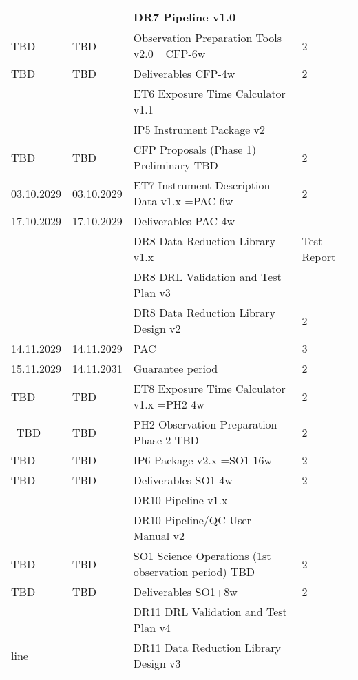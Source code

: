 \begin{table}
\begin{tabularx}{\textwidth}{llll}
   &		    & DR7 Pipeline v1.0					    &	\\
\hline
TBD    & TBD   & Observation Preparation Tools v2.0  =CFP-6w     	    &	2 \\
\hline
TBD	   & TBD   & Deliverables CFP-4w                                         &	2 \\
   &           & ET6 Exposure Time Calculator v1.1			    &	\\
&		   &	IP5 Instrument Package v2				    &	\\
\hline
TBD	   &	TBD	   &	CFP Proposals (Phase 1) Preliminary  TBD		    &	2 \\
\hline
03.10.2029 &	03.10.2029 &	ET7 Instrument Description Data v1.x =PAC-6w		    &	2 \\
\hline
17.10.2029 &	17.10.2029 &	Deliverables PAC-4w                                         &	\\
   	   &               &    DR8 Data Reduction Library v1.x & Test Report               &	\\
           &               &    DR8 DRL Validation and Test Plan v3                         &	\\
           &               &    DR8 Data Reduction Library Design v2			    &	2 \\
\hline
14.11.2029 &	14.11.2029 &	PAC							    &	3 \\
\hline
15.11.2029 &	14.11.2031 &	Guarantee period 					    &	2 \\
\hline
TBD        &	TBD        &	ET8 Exposure Time Calculator v1.x =PH2-4w		    &	2 \\
\
TBD        &	TBD        &	PH2 Observation Preparation Phase 2 TBD			    &	2 \\
\hline
TBD        &	TBD        &	IP6 Package v2.x =SO1-16w				    &	2 \\
\hline
TBD        &	TBD        &	Deliverables SO1-4w                                         &	2 \\
           &               &    DR10 Pipeline v1.x					    &	\\
           &		   &	DR10 Pipeline/QC User Manual v2				    &	\\
\hline
TBD        &	TBD        &	SO1 Science Operations (1st observation period) TBD	    &	2 \\
\hline
TBD        &	TBD        &	Deliverables SO1+8w                                         &	2 \\
	   &		   &	DR11 DRL Validation and Test Plan v4			    &	\\
line	   &		   &	DR11 Data Reduction Library Design v3			    &	\\

\end{tabularx}
\end{table}
